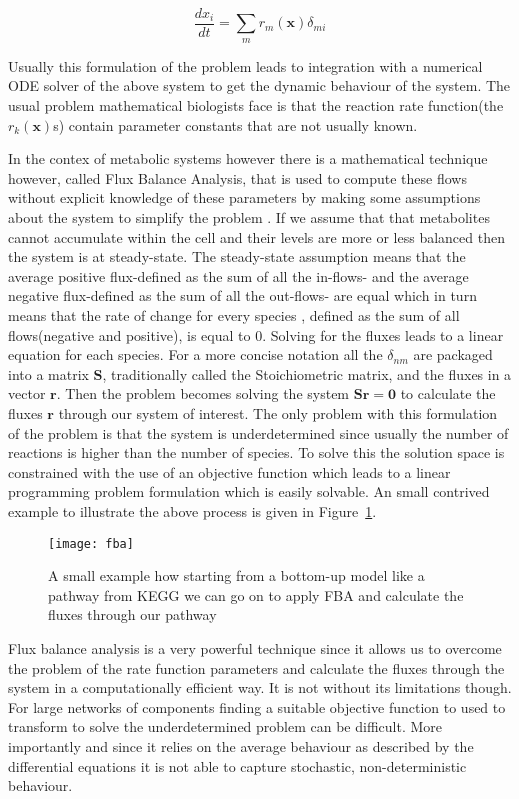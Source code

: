 \begin{equation*}
\frac{dx_i}{dt} = \sum_{m} r_m(\mathbf{x})\delta_{mi}
\end{equation*}

Usually this formulation of the problem leads to integration with a
numerical ODE solver of the above system to get the dynamic behaviour
of the system. The usual problem mathematical biologists face is that
the reaction rate function(the $r_k(\mathbf{x})$s) contain parameter
constants that are not usually known.

In the contex of metabolic systems however there is a mathematical technique however, called Flux Balance
Analysis, that is used to compute these flows without explicit
knowledge of these parameters by making some assumptions about the
system to simplify the problem \cite [] {orth2010flux}. If we assume that that metabolites
cannot accumulate within the cell and their levels are more or less
balanced then the system is at steady-state. The steady-state assumption means that the average positive flux-defined as the sum of
all the in-flows- and the average negative flux-defined as the sum of
all the out-flows- are equal which in turn means that the rate of
change for every species , defined as the sum of all flows(negative and
positive), is equal to 0. Solving for the fluxes leads to a linear equation for each
species. For a more concise notation all the $\delta_{nm}$ are
packaged into a matrix $\mathbf{S}$, traditionally called the Stoichiometric
matrix, and the fluxes in a vector $\mathbf{r}$. Then the problem
becomes solving the system $\mathbf{Sr} = \mathbf{0}$ to calculate the
fluxes $\mathbf{r}$ through our system of interest. The only problem
with this formulation of the problem is that the system is
underdetermined since usually the number of reactions is higher than
the number of species. To solve this the solution space is constrained
with the use of an objective function which leads to a linear
programming problem formulation which is easily solvable. An small
contrived example to illustrate the above process is given in
Figure~\ref{fig:fba}.

\begin{figure}[htbp!]
\centering
\texttt{[image: fba]}
\caption[Flux Balance analysis]{A small example how starting from a
  bottom-up model like a pathway from KEGG we can go on to apply FBA
  and calculate the fluxes through our pathway}
\label{fig:fba}
\end{figure}

Flux balance analysis is a very powerful technique since it allows us
to overcome the problem of the rate function parameters and calculate the
fluxes through the system in a computationally efficient way. It is
not without its limitations though. For large networks of components
finding a suitable objective function to used to transform to solve
the underdetermined problem can be difficult. More importantly and
since it relies on the average behaviour as described by the
differential equations it is not able to capture stochastic,
non-deterministic behaviour.

